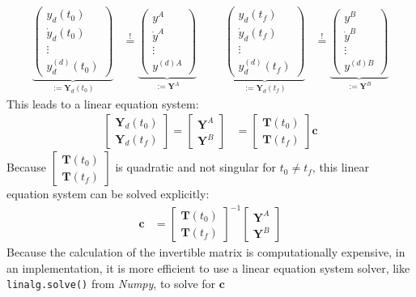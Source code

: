 \documentclass[a4paper,11pt,headings=standardclasses,parskip=half]{scrartcl}
\begin{document}
\begin{align*}
\underbrace{\begin{pmatrix} y_d(t_0) \\ \dot{y}_d(t_0) \\ \vdots \\ y_d^{(d)}(t_0) \end{pmatrix}}_{:=\mathbf{Y}_d(t_0)}
&\overset{!}{=}
\underbrace{\begin{pmatrix} y^A \\ \dot{y}^A \\ \vdots \\ y^{(d)A}  \end{pmatrix}}_{:=\mathbf{Y}^A}
&&&
\underbrace{\begin{pmatrix} y_d(t_f) \\ \dot{y}_d(t_f) \\ \vdots \\ y_d^{(d)}(t_f) \end{pmatrix}}_{:=\mathbf{Y}_d(t_f)}
&\overset{!}{=}
\underbrace{\begin{pmatrix} y^B \\ \dot{y}^B \\ \vdots \\ y^{(d)B}  \end{pmatrix}}_{:=\mathbf{Y}^B}
\end{align*}
This leads to a linear equation system:
\begin{align*}
\begin{bmatrix}
\mathbf{Y}_d(t_0) \\
\mathbf{Y}_d(t_f) 
\end{bmatrix}
=
\begin{bmatrix}
\mathbf{Y}^A \\
\mathbf{Y}^B
\end{bmatrix}
&=
\begin{bmatrix}
\mathbf{T}(t_0) \\
\mathbf{T}(t_f) 
\end{bmatrix}
\mathbf{c}
\end{align*}
Because $\begin{bmatrix}
\mathbf{T}(t_0) \\
\mathbf{T}(t_f) 
\end{bmatrix}$ is quadratic and not singular for $t_0\neq t_f$, this linear equation system can be solved explicitly:
\begin{align}
\label{eq:2}
\mathbf{c} &= \begin{bmatrix}
\mathbf{T}(t_0) \\
\mathbf{T}(t_f) 
\end{bmatrix}^{-1}
\begin{bmatrix}
\mathbf{Y}^A \\
\mathbf{Y}^B
\end{bmatrix}
\end{align}
Because the calculation of the invertible matrix is computationally expensive, in an implementation, it is more efficient to use a linear equation system solver, like \texttt{linalg.solve()} from \emph{Numpy}, to solve for $\mathbf{c}$
\end{document}

